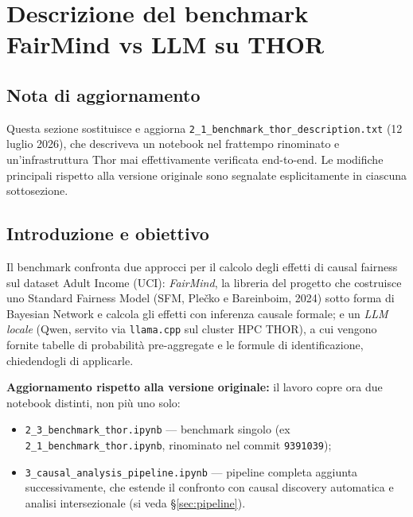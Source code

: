 
\section{Descrizione del benchmark FairMind vs LLM su THOR}

\subsection*{Nota di aggiornamento}
Questa sezione sostituisce e aggiorna \texttt{2\_1\_benchmark\_thor\_description.txt} (12 luglio 2026), che descriveva un notebook nel frattempo rinominato e un'infrastruttura Thor mai effettivamente verificata end-to-end. Le modifiche principali rispetto alla versione originale sono segnalate esplicitamente in ciascuna sottosezione.

\subsection{Introduzione e obiettivo}

Il benchmark confronta due approcci per il calcolo degli effetti di causal fairness sul dataset Adult Income (UCI): \emph{FairMind}, la libreria del progetto che costruisce uno Standard Fairness Model (SFM, Ple\v{c}ko e Bareinboim, 2024) sotto forma di Bayesian Network e calcola gli effetti con inferenza causale formale; e un \emph{LLM locale} (Qwen, servito via \texttt{llama.cpp} sul cluster HPC THOR), a cui vengono fornite tabelle di probabilit\`a pre-aggregate e le formule di identificazione, chiedendogli di applicarle.

\textbf{Aggiornamento rispetto alla versione originale:} il lavoro copre ora due notebook distinti, non pi\`u uno solo:
\begin{itemize}
  \item \texttt{2\_3\_benchmark\_thor.ipynb} --- benchmark singolo (ex \texttt{2\_1\_benchmark\_thor.ipynb}, rinominato nel commit \texttt{9391039});
  \item \texttt{3\_causal\_analysis\_pipeline.ipynb} --- pipeline completa aggiunta successivamente, che estende il confronto con causal discovery automatica e analisi intersezionale (si veda \S\ref{sec:pipeline}).
\end{itemize}

